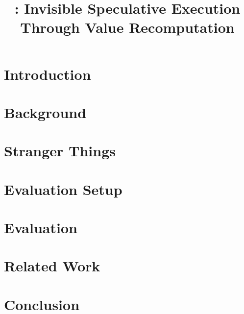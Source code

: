 \documentclass[conference]{IEEEtran}
\title{\arch: Invisible Speculative Execution Through Value Recomputation}
\author{}
\begin{document}
\maketitle
\thispagestyle{firstpage}
\pagestyle{plain}


\begin{abstract}

\end{abstract}

\section{Introduction}
\label{sec:intro}


\section{Background}
\label{sec:back}


\section{\arch}
\label{sec:arch}


\section{Stranger Things} %
\label{sec:stranger-things}


\section{Evaluation Setup}
\label{sec:setup}


\section{Evaluation}
\label{sec:eval}


\section{Related Work}
\label{sec:rel}


\section{Conclusion}
\label{sec:conc}


%




\end{document}
